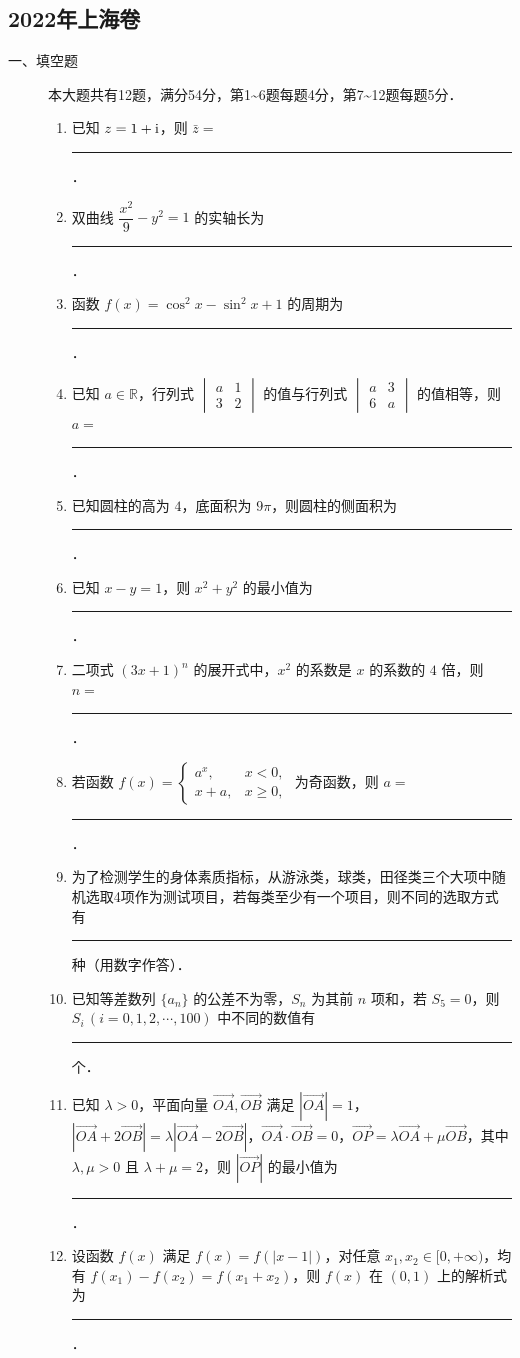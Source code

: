 \subsection{2022年上海卷}\label{gk:2022年上海卷}

\begin{description}
    \item[一、填空题] 本大题共有12题，满分54分，第1\textasciitilde6题每题4分，第7\textasciitilde12题每题5分．
    \begin{enumerate}[leftmargin=5pt]
        \item 已知 $z=1+\mathrm{i}$，则 $\bar{z}=$ \rule[-0.3ex]{3em}{0.4pt}．
        \item 双曲线 $\dfrac{x^2}{9}-y^2=1$ 的实轴长为 \rule[-0.3ex]{3em}{0.4pt}．
        \item 函数 $f(x)=\cos^2 x-\sin^2 x+1$ 的周期为 \rule[-0.3ex]{3em}{0.4pt}．
        \item 已知 $a\in\mathbb{R}$，行列式 $\begin{vmatrix}a&1\\3&2\end{vmatrix}$ 的值与行列式 $\begin{vmatrix}a&3\\6&a\end{vmatrix}$ 的值相等，则 $a=$ \rule[-0.3ex]{3em}{0.4pt}．
        \item 已知圆柱的高为 $4$，底面积为 $9\pi$，则圆柱的侧面积为 \rule[-0.3ex]{3em}{0.4pt}．
        \item 已知 $x-y=1$，则 $x^2+y^2$ 的最小值为 \rule[-0.3ex]{3em}{0.4pt}．
        \item 二项式 $(3x+1)^n$ 的展开式中，$x^2$ 的系数是 $x$ 的系数的 $4$ 倍，则 $n=$ \rule[-0.3ex]{3em}{0.4pt}．
        \item 若函数 $f(x)=\begin{cases}a^x,&x<0,\\x+a,&x\geqslant0,\end{cases}$ 为奇函数，则 $a=$ \rule[-0.3ex]{3em}{0.4pt}．
        \item 为了检测学生的身体素质指标，从游泳类，球类，田径类三个大项中随机选取4项作为测试项目，若每类至少有一个项目，则不同的选取方式有 \rule[-0.3ex]{3em}{0.4pt} 种（用数字作答）．
        \item 已知等差数列 $\{a_n\}$ 的公差不为零，$S_n$ 为其前 $n$ 项和，若 $S_5=0$，则 $S_i\,(i=0,1,2,\cdots,100)$ 中不同的数值有 \rule[-0.3ex]{3em}{0.4pt} 个．
        \item 已知 $\lambda>0$，平面向量 $\overrightarrow{OA},\overrightarrow{OB}$ 满足 $|\overrightarrow{OA}|=1$，$|\overrightarrow{OA}+2\overrightarrow{OB}|=\lambda|\overrightarrow{OA}-2\overrightarrow{OB}|$，$\overrightarrow{OA}\cdot\overrightarrow{OB}=0$，$\overrightarrow{OP}=\lambda\overrightarrow{OA}+\mu\overrightarrow{OB}$，其中 $\lambda,\mu>0$ 且 $\lambda+\mu=2$，则 $|\overrightarrow{OP}|$ 的最小值为 \rule[-0.3ex]{3em}{0.4pt}．
        \item 设函数 $f(x)$ 满足 $f(x)=f(|x-1|)$，对任意 $x_1,x_2\in[0,+\infty)$，均有 $f(x_1)-f(x_2)=f(x_1+x_2)$，则 $f(x)$ 在 $(0,1)$ 上的解析式为 \rule[-0.3ex]{3em}{0.4pt}．
    \end{enumerate}
\end{description}

